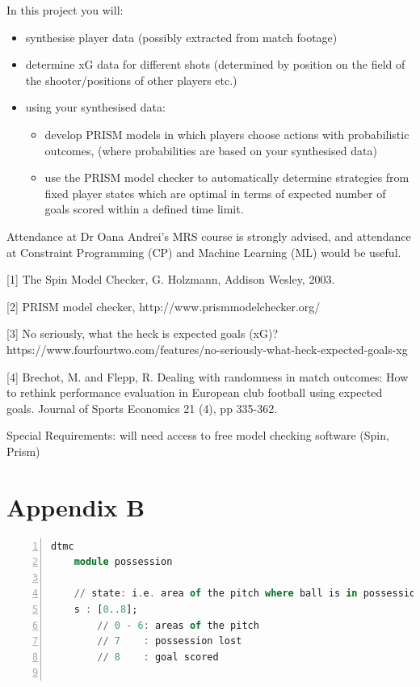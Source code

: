 \documentclass{l4proj}
\begin{document}
\begin{appendices}
In this project you will: 
\begin{itemize}
    \item synthesise player data (possibly extracted from match footage) 
    \item determine xG data for different shots (determined by position on the field of the shooter/positions of other players etc.)
    \item using your synthesised data:
    \begin{itemize}
        \item develop PRISM models in which players choose actions with probabilistic outcomes, (where probabilities are based on your synthesised data) 
        \item use the PRISM model checker to automatically determine strategies from fixed player states which are optimal in terms of expected number of goals scored within a defined time limit.  
        \end{itemize}
    \end{itemize}
    
Attendance at Dr Oana Andrei’s MRS course is strongly advised, and attendance at Constraint Programming (CP) and Machine Learning (ML) would be useful.  

[1] The Spin Model Checker, G. Holzmann, Addison Wesley, 2003.  

[2] PRISM model checker, http://www.prismmodelchecker.org/  

[3] No seriously, what the heck is expected goals (xG)?	 https://www.fourfourtwo.com/features/no-seriously-what-heck-expected-goals-xg 

[4] Brechot, M. and Flepp, R. Dealing with randomness in match outcomes: How to rethink performance evaluation in European club football using expected goals. Journal of Sports Economics 21 (4), pp 335-362.  

Special Requirements: will need access to free model checking software (Spin, Prism) 
    
\chapter{Appendix B}\label{lst:appendix2}
\begin{lstlisting}[language=Haskell, numbers=left, caption=Initial DTMC specification in the PRISM modelling language.] 
    dtmc
    module possession

	// state: i.e. area of the pitch where ball is in possession
	s : [0..8];
		// 0 - 6: areas of the pitch
		// 7    : possession lost
		// 8    : goal scored


\end{lstlisting}
\end{appendices}
\end{document}
